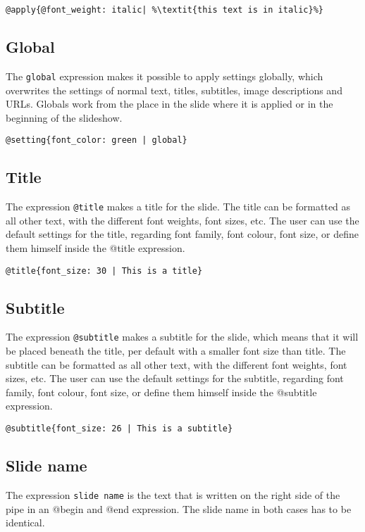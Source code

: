 \begin{lstlisting}[frame=single]
	@apply{@font_weight: italic| %\textit{this text is in italic}%}
\end{lstlisting}

\subsection{Global}
The \texttt{global} expression makes it possible to apply settings globally, which overwrites the settings of normal text, titles, subtitles, image descriptions and URLs. Globals work from the place in the slide where it is applied or in the beginning of the slideshow. 
\begin{lstlisting}[frame=single]
	@setting{font_color: green | global}
\end{lstlisting}


\subsection{Title}
The expression \texttt{@title} makes a title for the slide. The title can be formatted as all other text, with the different font weights, font sizes, etc. The user can use the default settings for the title, regarding font family, font colour, font size, or define them himself inside the @title expression.
\begin{lstlisting}[frame=single]
	@title{font_size: 30 | This is a title}
\end{lstlisting}


\subsection{Subtitle}
The expression \texttt{@subtitle} makes a subtitle for the slide, which means that it will be placed beneath the title, per default with a smaller font size than title. The subtitle can be formatted as all other text, with the different font weights, font sizes, etc. The user can use the default settings for the subtitle, regarding font family, font colour, font size, or define them himself inside the @subtitle expression.

\begin{lstlisting}[frame=single]
	@subtitle{font_size: 26 | This is a subtitle}
\end{lstlisting}


\subsection{Slide name}
The expression \texttt{slide name} is the text that is written on the right side of the pipe in an @begin{} and @end{} expression. The slide name in both cases has to be identical.


